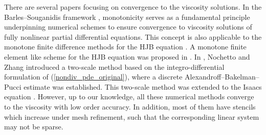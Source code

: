 \documentclass[12pt]{amsart}
\theoremstyle{definition}
\theoremstyle{remark}
\begin{document}
There are several papers 
\cite{BS1991,BZ1,CamilliJakobsen2009,CL1,DK1,FL1,FS1,JensenSmears2013,
Kocan1,Oberman1,NZ1,SalgadoZhang2019}
focusing on convergence to the viscosity solutions.  
In the Barles–Souganidis framework \cite{BS1991}, monotonicity serves as a fundamental principle underpinning 
numerical schemes to ensure convergence to viscosity solutions of fully nonlinear partial differential equations. 
This concept is also applicable to the monotone finite difference methods for the HJB equation \cite{BZ1,FS1}. 
A monotone finite element like scheme for the HJB equation was proposed in \cite{CamilliJakobsen2009}. 
In \cite{NZ1}, Nochetto and Zhang introduced a two-scale method based on the integro-differential 
formulation of (\ref{nondiv_pde_original}), where a discrete Alexandroff–Bakelman–Pucci estimate 
was established. This two-scale method \cite{NZ1} was extended to the Isaacs equation \cite{SalgadoZhang2019}.
However, up to our knowledge, all these numerical methods converge to the viscosity with low 
order accuracy. In addition, most of them have stencils which increase 
under mesh refinement, such that the corresponding linear system may not be sparse. 
\end{document}
